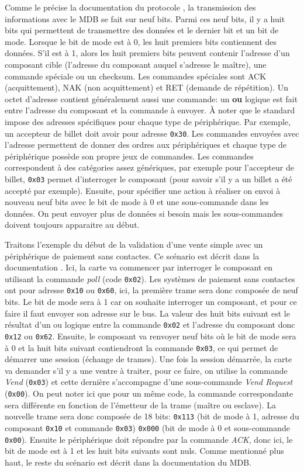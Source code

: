 \documentclass[a4paper]{article}
\begin{document}
Comme le précise la documentation du protocole \cite{mdbdoc}, la transmission
des informations avec le MDB se fait sur neuf bits. Parmi ces neuf bits, il y a
huit bits qui permettent de transmettre des données et le dernier bit et un bit
de mode. Lorsque le bit de mode est à 0, les huit premiers bits contiennent des
données. S'il est à 1, alors les huit premiers bits peuvent contenir l'adresse
d'un composant cible (l'adresse du composant auquel s'adresse le maître), une
commande spéciale ou un checksum. Les commandes spéciales sont ACK
(acquittement), NAK (non acquittement) et RET (demande de répétition). Un octet
d'adresse contient généralement aussi une commande: un \textbf{ou} logique est
fait entre l'adresse du composant et la commande à envoyer. À noter que le
standard impose des adresses spécifiques pour chaque type de périphérique. Par
exemple, un accepteur de billet doit avoir pour adresse \verb|0x30|. Les
commandes envoyées avec l'adresse permettent de donner des ordres aux
périphériques et chaque type de périphérique possède son propre jeux de
commandes. Les commandes correspondent à des catégories assez génériques, par
exemple pour l'accepteur de billet, \verb|0x03| permet d'interroger le composant
(pour savoir s'il y a un billet a été accepté par exemple). Ensuite, pour
spécifier une action à réaliser on envoi à nouveau neuf bits avec le bit de mode
à 0 et une sous-commande dans les données. On peut envoyer plus de données si
besoin mais les sous-commandes doivent toujours apparaitre au début.

Traitons l'exemple du début de la validation d'une vente simple avec un
périphérique de paiement sans contactes. Ce scénario est décrit dans la
documentation \cite[p.~169]{mdbdoc}. Ici, la carte va commencer par interroger
le composant en utilisant la commande \textit{poll} (code \verb|0x02|). Les
systèmes de paiement sans contactes ont pour adresse \verb|0x10| ou \verb|0x60|,
ici, la première trame sera donc composée de neuf bits. Le bit de mode sera à 1
car on souhaite interroger un composant, et pour ce faire il faut envoyer son
adresse sur le bus. La valeur des huit bits suivant est le résultat d'un ou
logique entre la commande \verb|0x02| et l'adresse du composant donc \verb|0x12|
ou \verb|0x62|. Ensuite, le composant va renvoyer neuf bits où le bit de mode
sera à 0 et la huit bits suivant contiendront la commande \verb|0x03|, ce qui
permet de démarrer une session (échange de trames). Une fois la session
démarrée, la carte va demander s'il y a une ventre à traiter, pour ce faire, on
utilise la commande \textit{Vend} (\verb|0x03|) et cette dernière s'accompagne
d'une sous-commande \textit{Vend Request} (\verb|0x00|). On peut noter ici que
pour un même code, la commande correspondante sera différente en fonction de
l'émetteur de la trame (maître ou esclave). La nouvelle trame sera donc composée
de 18 bits: \verb|0x113| (bit de mode à 1, adresse du composant \verb|0x10| et
commande \verb|0x03|) \verb|0x000| (bit de mode à 0 et sous-commande
\verb|0x00|). Ensuite le périphérique doit répondre par la commande
\textit{ACK}, donc ici, le bit de mode est à 1 et les huit bits suivants sont
nuls. Comme mentionné plus haut, le reste du scénario est décrit dans la
documentation du MDB.
\end{document}
